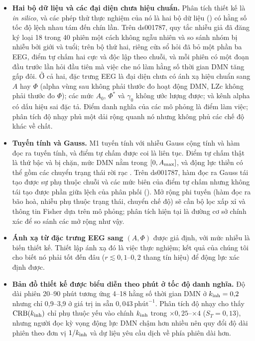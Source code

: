 \begin{itemize}
  \item \textbf{Hai bộ dữ liệu và các đại diện chưa hiệu chuẩn.} Phân tích thiết kế là \emph{in silico}, và các phép thử thực nghiệm của nó là hai bộ dữ liệu () có hằng số tốc độ lệch nhau tám đến chín lần. Trên ds001787, quy tắc nhiễu giả đã đăng ký loại 18 trong 40 phiên một cách không ngẫu nhiên và so sánh nhóm bị nhiễu bởi giới và tuổi; trên bộ thứ hai, riêng cửa sổ hỏi đã bỏ một phần ba EEG, điểm tự chấm hai cực và độc lập theo chuỗi, và mỗi phiên có một đoạn đầu trước lần hỏi đầu tiên mà việc che nó làm hằng số thời gian DMN tăng gấp đôi. Ở cả hai, đặc trưng EEG là đại diện chưa có ánh xạ hiệu chuẩn sang $A$ hay $\Phi$ (alpha vùng sau không phải thước đo hoạt động DMN, LZc không phải thước đo $\Phi$); các mức $A_0$, $\Phi^*$ và $\gamma_0$ không ước lượng được; và kênh alpha có dấu hiệu sai đặc tả. Điểm danh nghĩa của các mô phỏng là điểm làm việc; phân tích độ nhạy phủ một dải rộng quanh nó nhưng không phủ các chế độ khác về chất.
  \item \textbf{Tuyến tính và Gauss.} M1 tuyến tính với nhiễu Gauss cộng tính và hàm đọc ra tuyến tính, và điểm tự chấm được coi là liên tục. Điểm tự chấm thật là thứ bậc và bị chặn, mức DMN nằm trong $[0,A_{\max}]$, và động lực thiền có thể gồm các chuyển trạng thái rời rạc \citep{Hasenkamp2012,Christoff2016}. Trên ds001787, hàm đọc ra Gauss tái tạo được sự phụ thuộc chuỗi và các mức biên của điểm tự chấm nhưng không tái tạo được phần giữa lệch của phân phối (). Mở rộng phi tuyến (hàm đọc ra bão hoà, nhiễu phụ thuộc trạng thái, chuyển chế độ) sẽ cần bộ lọc xấp xỉ và thông tin Fisher dựa trên mô phỏng; phân tích hiện tại là đường cơ sở chính xác để so sánh các mở rộng như vậy.
  \item \textbf{Ánh xạ từ đặc trưng EEG sang $(A,\Phi)$} được giả định, với mức nhiễu là biến thiết kế. Thiết lập ánh xạ đó là việc thực nghiệm; kết quả của chúng tôi cho biết nó phải tốt đến đâu ($r\lesssim0{,}1$--$0{,}2$ thang tín hiệu) để động lực xác định được.
  \item \textbf{Bản đồ thiết kế được biểu diễn theo phút ở tốc độ danh nghĩa.} Độ dài phiên 20--90 phút tương ứng 4--18 hằng số thời gian DMN ở $k_{\mathrm{inh}}=0{,}2$ nhưng chỉ 0,9--3,9 ở giá trị in sẵn $0{,}043\ \text{phút}^{-1}$. Phân tích độ nhạy cho thấy $\mathrm{CRB}(k_{\mathrm{inh}})$ chỉ phụ thuộc yếu vào chính $k_{\mathrm{inh}}$ trong $\times0{,}25$--$\times4$ ($S_T=0{,}13$), nhưng người đọc kỳ vọng động lực DMN chậm hơn nhiều nên quy đổi độ dài phiên theo đơn vị $1/k_{\mathrm{inh}}$ và dự liệu yêu cầu dịch về phía phiên dài hơn.

\end{itemize}
